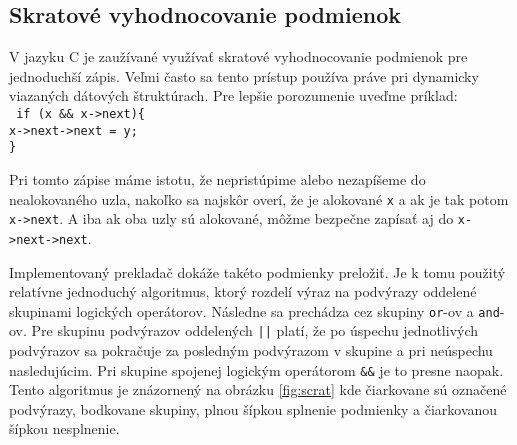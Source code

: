 \subsection{Skratové vyhodnocovanie podmienok}
V jazyku C je zaužívané využívať skratové vyhodnocovanie podmienok pre jednoduchší zápis. Veľmi často sa tento prístup používa práve pri dynamicky viazaných dátových štruktúrach. Pre lepšie porozumenie uveďme príklad:\\

\noindent
\texttt{
if (x \&\& x->next)\{\\
\tab x->next->next = y;\\
\}\\
}

Pri tomto zápise máme istotu, že nepristúpime alebo nezapíšeme do nealokovaného uzla, nakoľko sa najskôr overí, že je  alokované \texttt{x} a ak je tak potom \texttt{x->next}. A iba ak oba uzly sú alokované, môžme bezpečne zapísať aj do \texttt{x->next->next}.

Implementovaný prekladač dokáže takéto podmienky preložiť. Je k tomu použitý relatívne jednoduchý algoritmus, ktorý rozdelí výraz na podvýrazy oddelené skupinami logických operátorov. Následne sa prechádza cez skupiny \texttt{or}-ov a \texttt{and}-ov. Pre skupinu podvýrazov oddelených \texttt{||} platí, že po úspechu jednotlivých podvýrazov sa pokračuje za posledným podvýrazom v skupine a pri neúspechu nasledujúcim. Pri skupine spojenej logickým operátorom \texttt{\&\&} je to presne naopak. Tento algoritmus je znázornený na obrázku \ref{fig:scrat} kde čiarkovane sú označené podvýrazy, bodkovane skupiny, plnou šípkou splnenie podmienky a čiarkovanou šípkou nesplnenie.

